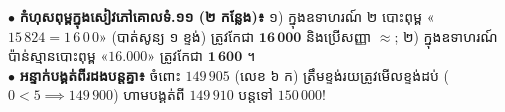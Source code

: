 \documentclass[a4paper,10pt]{article}
\begin{document}
\begin{tcolorbox}[
  enhanced, sharp corners, colback=panelgray, colframe=black,
  boxrule=0.85pt, boxsep=2.5pt, top=4.5pt, bottom=4.5pt, left=6pt, right=6pt
]
  \fontsize{8.6pt}{12.7pt}\selectfont
  $\bullet$ \textbf{កំហុសពុម្ពក្នុងសៀវភៅគោលទំ.១១ (២ កន្លែង)៖} ១) ក្នុងឧទាហរណ៍ ២ បោះពុម្ព «$15\,824 = 1\,6\,0\,0$» (បាត់សូន្យ ១ ខ្ទង់) ត្រូវកែជា $\mathbf{16\,000}$ និងប្រើសញ្ញា $\approx$; ២) ក្នុងឧទាហរណ៍ប៉ាន់ស្មានបោះពុម្ព «$16.000$» ត្រូវកែជា $\mathbf{1\,600}$ ។\\[2pt]
  $\bullet$ \textbf{អន្ទាក់បង្គត់ពីរដងបន្តគ្នា៖} ចំពោះ $149\,905$ (លេខ ៦ ក) ត្រឹមខ្ទង់រយត្រូវមើលខ្ទង់ដប់ ($0 < 5 \implies 149\,900$) ហាមបង្គត់ពី $149\,910$ បន្តទៅ $150\,000$!
\end{tcolorbox}
\end{document}
